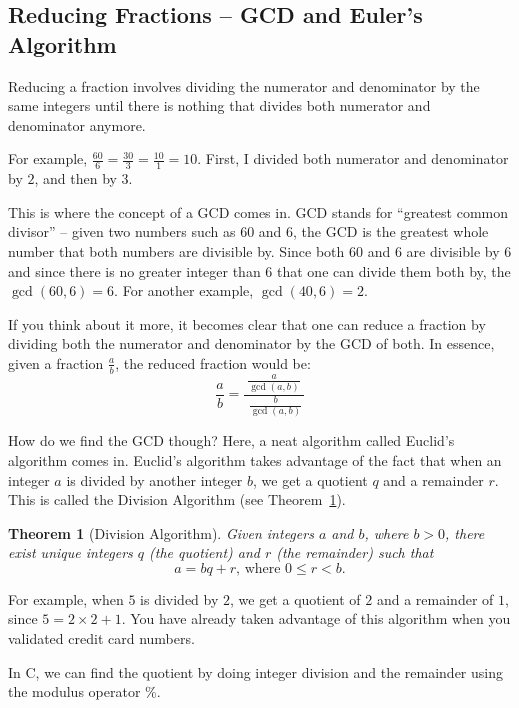 \documentclass[11pt]{cselabheader}
\theoremstyle{plain}
\newtheorem{thm}{Theorem}
\begin{document}
\begin{appendices}
	\section{Reducing Fractions -- GCD and Euler's Algorithm}
	\label{sec:gcd}

	Reducing a fraction involves dividing the numerator and denominator by
	the same integers until there is nothing that divides both numerator and
	denominator anymore.

	For example, $\frac{60}{6} = \frac{30}{3} = \frac{10}{1} = 10$. First, I
	divided both numerator and denominator by $2$, and then by $3$. 

	This is where the concept of a GCD comes in. GCD stands for ``greatest
	common divisor'' -- given two numbers such as $60$ and $6$, the GCD is the
	greatest whole number that both numbers are divisible by. Since both $60$ 
	and $6$ are divisible by $6$ and since there is no greater integer than $6$
	that one can divide them both by, the $\gcd(60, 6) = 6$. For another
	example, $\gcd(40, 6) = 2$.

	If you think about it more, it becomes clear that one can reduce a fraction
	by dividing both the numerator and denominator by the GCD of both. In
	essence, given a fraction $\frac{a}{b}$, the reduced fraction would be:
	\[
		\frac{a}{b} = \frac{~\frac{a}{\gcd(a, b)}~}{~\frac{b}{\gcd(a, b)}}
	\]

	How do we find the GCD though? Here, a neat algorithm called Euclid's
	algorithm comes in. Euclid's algorithm takes advantage of the fact that
	when an integer $a$ is divided by another integer $b$, we get a quotient
	$q$ and a remainder $r$. This is called the Division Algorithm (see
	Theorem~\ref{thm:div}). 

	\begin{thm}[Division Algorithm] \label{thm:div}
		Given integers $a$ and $b$, where $b > 0$, there exist unique integers
		$q$ (the quotient) and $r$ (the remainder) such that 
		\[ a = bq + r\text{, where }0 \leq r < b. \]
	\end{thm}

	For example, when $5$ is divided by $2$, we get a quotient of $2$ and a
	remainder of $1$, since $5 = 2 \times 2 + 1$. You have already taken 
	advantage of this algorithm when you validated credit card numbers. 

	In C, we can find the quotient by doing integer division and the remainder
	using the modulus operator \%.


\end{appendices}
\end{document}
